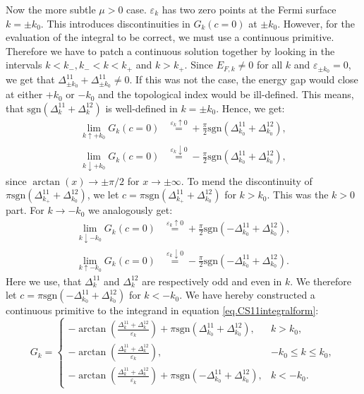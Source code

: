 Now the more subtle $\mu > 0$ case. $\varepsilon_k$ has two zero points at the Fermi surface $k = \pm k_0$. This introduces discontinuities in $G_k(c=0)$ at $\pm k_0$. However, for the evaluation of the integral to be correct, we must use a continuous primitive. Therefore we have to patch a continuous solution together by looking in the intervals $k < k_-, k_- < k < k_+$ and $k>k_+$. Since $E_{F,k} \neq 0$ for all $k$ and $\varepsilon_{\pm k_0} = 0$, we get that $\Delta^{11}_{\pm k_0} + \Delta^{11}_{\pm k_0} \neq 0$. If this was not the case, the energy gap would close at either $+k_0$ or $-k_0$ and the topological index would be ill-defined. This means, that $\text{sgn}(\Delta^{11}_k + \Delta^{12}_k)$ is well-defined in $k = \pm k_0$. Hence, we get:
\begin{align}
\lim_{k \uparrow +k_0} G_k(c = 0)   &\overset{\varepsilon_k \uparrow 0}{=}   +\frac{\pi}{2}\text{sgn}(\Delta^{11}_{k_0} + \Delta^{12}_{k_0}), \nonumber \\
\lim_{k \downarrow +k_0} G_k(c = 0) &\overset{\varepsilon_k \downarrow 0}{=} -\frac{\pi}{2}\text{sgn}(\Delta^{11}_{k_0} + \Delta^{12}_{k_0}), \nonumber
\end{align}
since $\arctan(x) \to \pm \pi/2$ for $x \to \pm \infty$. To mend the discontinuity of $\pi\text{sgn}(\Delta^{11}_{k_+} + \Delta^{12}_{k_0})$, we let $c = \pi\text{sgn}(\Delta^{11}_{k_+} + \Delta^{12}_{k_0})$ for $k > k_0$. This was the $k > 0$ part. For $k \to -k_0$ we analogously get:
\begin{align}
\lim_{k \downarrow -k_0} G_k(c = 0) &\overset{\varepsilon_k \uparrow 0}{=} +\frac{\pi}{2}\text{sgn}(-\Delta^{11}_{k_0} + \Delta^{12}_{k_0}), \nonumber \\
\lim_{k \uparrow -k_0} G_k(c = 0)   &\overset{\varepsilon_k \downarrow 0}{=} -\frac{\pi}{2}\text{sgn}(-\Delta^{11}_{k_0} + \Delta^{12}_{k_0}). \nonumber
\end{align}
Here we use, that $\Delta^{11}_k$ and $\Delta^{12}_k$ are respectively odd and even in $k$. We therefore let $c = \pi \text{sgn}(-\Delta^{11}_{k_0} + \Delta^{12}_{k_0})$ for $k < - k_0$. We have hereby constructed a continuous primitive to the integrand in equation \eqref{eq.CS11integralform}:
\begin{equation}
G_k = \left\{ \begin{matrix} 
-\arctan\left(\frac{\Delta^{11}_k + \Delta^{12}_k }{\varepsilon_k}\right) + \pi\text{sgn}(\Delta^{11}_{k_0} + \Delta^{12}_{k_0}), & k > k_0, \\
-\arctan\left(\frac{\Delta^{11}_k + \Delta^{12}_k }{\varepsilon_k}\right), & -k_0 \leq k \leq k_0, \\
-\arctan\left(\frac{\Delta^{11}_k + \Delta^{12}_k }{\varepsilon_k}\right) + \pi \text{sgn}(-\Delta^{11}_{k_0} + \Delta^{12}_{k_0}), & k < -k_0.
  \end{matrix} \right.
\label{eq.Gkmugreater0}
\end{equation}

